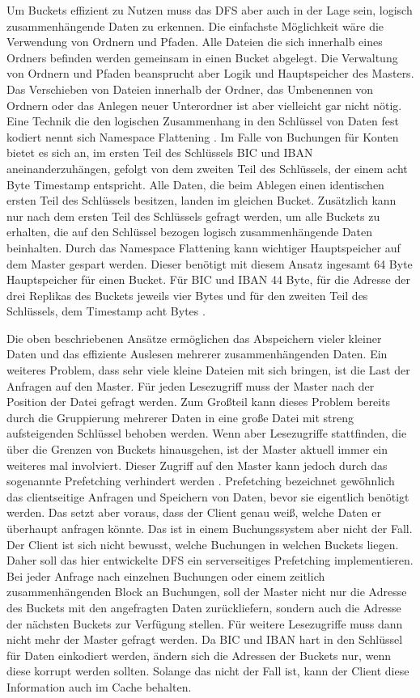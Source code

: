 \documentclass[12pt,oneside,a4paper,parskip]{scrbook}
\begin{document}
Um Buckets effizient zu Nutzen muss das DFS aber auch in der Lage sein, logisch zusammenhängende Daten zu erkennen. Die einfachste Möglichkeit wäre die Verwendung von Ordnern und Pfaden. Alle Dateien die sich innerhalb eines Ordners befinden werden gemeinsam in einen Bucket abgelegt. Die Verwaltung von Ordnern und Pfaden beansprucht aber Logik und Hauptspeicher des Masters. Das Verschieben von Dateien innerhalb der Ordner, das Umbenennen von Ordnern oder das Anlegen neuer Unterordner ist aber vielleicht gar nicht nötig. Eine Technik die den logischen Zusammenhang in den Schlüssel von Daten fest kodiert nennt sich Namespace Flattening \cite{smallfilesObjectStorage}. Im Falle von Buchungen für Konten bietet es sich an, im ersten Teil des Schlüssels BIC und IBAN aneinanderzuhängen, gefolgt von dem zweiten Teil des Schlüssels, der einem acht Byte Timestamp entspricht. Alle Daten, die beim Ablegen einen identischen ersten Teil des Schlüssels besitzen, landen im gleichen Bucket. Zusätzlich kann nur nach dem ersten Teil des Schlüssels gefragt werden, um alle Buckets zu erhalten, die auf den Schlüssel bezogen logisch zusammenhängende Daten beinhalten. Durch das Namespace Flattening kann wichtiger Hauptspeicher auf dem Master gespart werden. Dieser benötigt mit diesem Ansatz ingesamt 64 Byte Hauptspeicher für einen Bucket. Für BIC und IBAN 44 Byte, für die Adresse der drei Replikas des Buckets jeweils vier Bytes und für den zweiten Teil des Schlüssels, dem Timestamp acht Bytes \cite{bic}\cite{iban}.

Die oben beschriebenen Ansätze ermöglichen das Abspeichern vieler kleiner Daten und das effiziente Auslesen mehrerer zusammenhängenden Daten. Ein weiteres Problem, dass sehr viele kleine Dateien mit sich bringen, ist die Last der Anfragen auf den Master. Für jeden Lesezugriff muss der Master nach der Position der Datei gefragt werden. Zum Großteil kann dieses Problem bereits durch die Gruppierung mehrerer Daten in eine große Datei mit streng aufsteigenden Schlüssel behoben werden. Wenn aber Lesezugriffe stattfinden, die über die Grenzen von Buckets hinausgehen, ist der Master aktuell immer ein weiteres mal involviert. Dieser Zugriff auf den Master kann jedoch durch das sogenannte Prefetching verhindert werden \cite{smallfilesObjectStorage} \cite{smallFilePrefetching}. Prefetching bezeichnet gewöhnlich das clientseitige Anfragen und Speichern von Daten, bevor sie eigentlich benötigt werden. Das setzt aber voraus, dass der Client genau weiß, welche Daten er überhaupt anfragen könnte. Das ist in einem Buchungssystem aber nicht der Fall. Der Client ist sich nicht bewusst, welche Buchungen in welchen Buckets liegen. Daher soll das hier entwickelte DFS ein serverseitiges Prefetching implementieren. Bei jeder Anfrage nach einzelnen Buchungen oder einem zeitlich zusammenhängenden Block an Buchungen, soll der Master nicht nur die Adresse des Buckets mit den angefragten Daten zurückliefern, sondern auch die Adresse der nächsten Buckets zur Verfügung stellen. Für weitere Lesezugriffe muss dann nicht mehr der Master gefragt werden. Da BIC und IBAN hart in den Schlüssel für Daten einkodiert werden, ändern sich die Adressen der Buckets nur, wenn diese korrupt werden sollten. Solange das nicht der Fall ist, kann der Client diese Information auch im Cache behalten.
\end{document}
